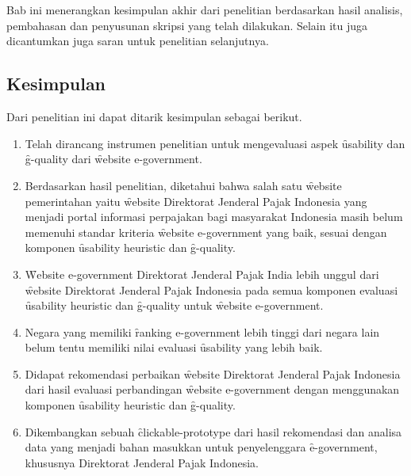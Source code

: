 \chapter{\babEnam}
Bab ini menerangkan kesimpulan akhir dari penelitian berdasarkan hasil analisis, pembahasan dan penyusunan skripsi yang telah dilakukan. Selain itu juga dicantumkan juga saran untuk penelitian selanjutnya.
\section{Kesimpulan}
Dari penelitian ini dapat ditarik kesimpulan sebagai berikut.
\begin{enumerate}
	\item Telah dirancang instrumen penelitian untuk mengevaluasi aspek \f{usability} dan \f{g-quality} dari \f{website e-government}.
	\item Berdasarkan hasil penelitian, diketahui bahwa salah satu \f{website} pemerintahan yaitu \f{website} Direktorat Jenderal Pajak Indonesia yang menjadi portal informasi perpajakan bagi masyarakat Indonesia masih belum memenuhi standar kriteria \f{website e-government} yang baik, sesuai dengan komponen \f{usability heuristic} dan \f{g-quality}. 
	\item \f{Website e-government} Direktorat Jenderal Pajak India lebih unggul dari \f{website} Direktorat Jenderal Pajak Indonesia pada semua komponen evaluasi \f{usability heuristic} dan \f{g-quality} untuk \f{website e-government}.
	\item Negara yang memiliki \f{ranking e-government} lebih tinggi dari negara lain belum tentu memiliki nilai evaluasi \f{usability} yang lebih baik.
	\item Didapat rekomendasi perbaikan \f{website} Direktorat Jenderal Pajak Indonesia dari hasil evaluasi perbandingan \f{website e-government} dengan menggunakan komponen \f{usability heuristic} dan \f{g-quality}.
	\item Dikembangkan sebuah \f{clickable-prototype} dari hasil rekomendasi dan analisa data yang menjadi bahan masukkan untuk penyelenggara \f{e-government}, khususnya Direktorat Jenderal Pajak Indonesia.
\end{enumerate}
\pagebreak

